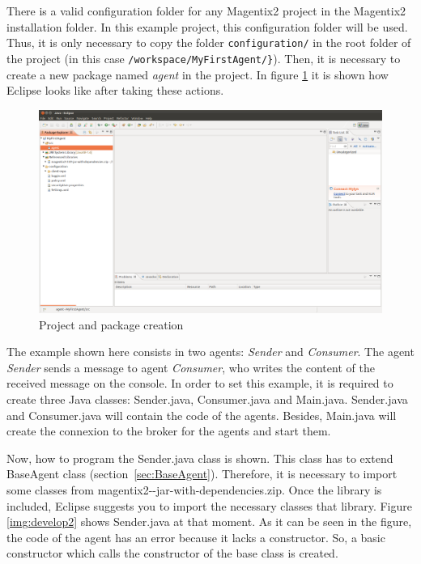 There is a valid configuration folder for any Magentix2 project in the Magentix2 installation folder. In this example project, this configuration folder will be used. Thus, it is only necessary to copy the folder \verb|configuration/| in the root folder of the project (in this case \verb|/workspace/MyFirstAgent/}|). Then, it is necessary to create a new package named \textit{agent} in the project. In figure \ref{img:develop1} it is shown how Eclipse looks like after taking these actions.
\begin{figure}[!h]
\centering
\includegraphics[scale=0.25]{Quickstart/images/develop1}
\caption{Project and package creation}
\label{img:develop1}
\end{figure}

The example shown here consists in two agents: \textit{Sender} and \textit{Consumer}. The agent \textit{Sender}  sends a message to agent \textit{Consumer}, who  writes the content of the received message on the console. In order to set this example, it is required to create three Java classes: Sender.java, Consumer.java and Main.java. Sender.java and Consumer.java will contain the code of the agents. Besides, Main.java will create the connexion to the broker for the agents and start them.

Now, how to program the Sender.java class is shown. This class has to extend BaseAgent class (section~\ref{sec:BaseAgent}). Therefore, it is necessary  to import some classes from magentix2-\MagentixVersion-jar-with-dependencies.zip. Once the library is included, Eclipse suggests you to import the necessary classes that library. Figure \ref{img:develop2} shows Sender.java at that moment. As it can be seen in the figure, the code of the agent has an error because it lacks a constructor. So, a basic constructor which calls the constructor of the base class is created.

